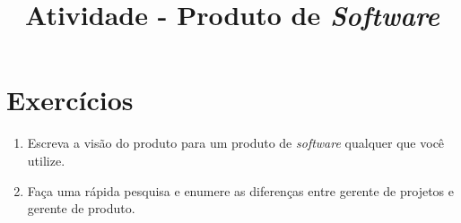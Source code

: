 \documentclass[12pt,a4paper]{article}
\title{Atividade - Produto de \textit{Software}}
\author{}
\date{}
\begin{document}
   \maketitle
   \section*{Exercícios}
      \begin{enumerate}
         \item Escreva a visão do produto para um produto de \textit{software} qualquer que você utilize. 
         \item Faça uma rápida pesquisa e enumere as diferenças entre gerente de projetos e gerente de produto.
      \end{enumerate}
      
\end{document}
